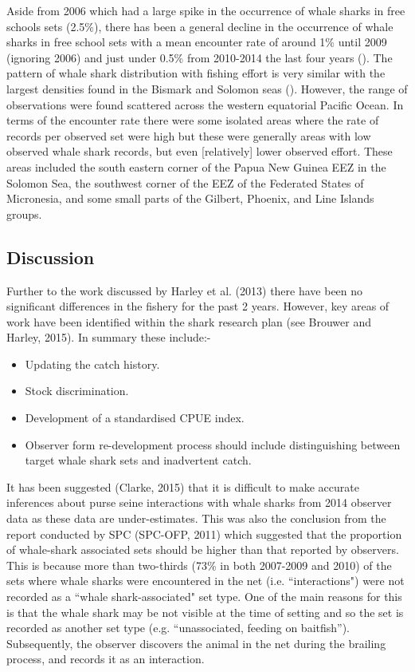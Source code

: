 \documentclass[12pt]{SCreport}
\begin{document}
Aside from 2006 which had a large spike in the occurrence of whale sharks in free schools sets (2.5\%), there has been a general decline in the occurrence of whale sharks in free school sets with a mean encounter rate of around 1\%  until 2009 (ignoring 2006) and just under 0.5\% from 2010-2014 the last four years ().  The pattern of whale shark distribution with fishing effort is very similar with the largest densities found in the Bismark and Solomon seas (). However, the range of observations were found scattered across the western equatorial Pacific Ocean. In terms of the encounter rate there were some isolated areas where the rate of records per observed set were high but these were generally areas with low observed whale shark records, but even [relatively] lower observed effort. These areas included the south eastern corner of the Papua New Guinea EEZ in the Solomon Sea, the southwest corner of the EEZ of the Federated States of Micronesia, and some small parts of the Gilbert, Phoenix, and Line Islands groups.
  
\subsection{Discussion}  
Further to the work discussed by Harley et al. (2013) there have been no significant differences in the fishery for the past 2 years.  However, key areas of work have been identified within the shark research plan (see Brouwer and Harley, 2015).  In summary these include:-

\begin{itemize}
\item{} Updating the catch history.
\item{} Stock discrimination.
\item{} Development of a standardised CPUE index.
\item{} Observer form re-development process should include distinguishing between target whale shark sets and inadvertent catch.
\end{itemize}

It has been suggested (Clarke, 2015) that it is difficult to make accurate inferences about purse seine interactions with whale sharks from 2014 observer data as these data are under-estimates.  This was also the conclusion from the report conducted by SPC (SPC-OFP, 2011) which suggested that the proportion of whale-shark associated sets should be higher than that reported by observers. This is because more than two-thirds (73\% in both 2007-2009 and 2010) of the sets where whale sharks were encountered in the net (i.e. ``interactions") were not recorded as a ``whale shark-associated" set type.  One of the main reasons for this is that the whale shark may be not visible at the time of setting and so the set is recorded as another set type (e.g. ``unassociated, feeding on baitfish''). Subsequently, the observer discovers the animal in the net during the brailing process, and records it as an interaction. 
\end{document}
